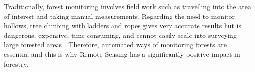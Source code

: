 \documentclass{subfiles}
\begin{document}
{\color{blue}Traditionally, forest monitoring involves field work such as travelling into the area of interest and taking manual measurements. Regarding the need to monitor hollows}, tree climbing with ladders and ropes gives very accurate results but is dangerous, expensive, time consuming, and cannot easily scale into surveying large forested areas \cite{Harper2004}\cite{Rayner2011}. Therefore, automated ways of monitoring forests are essential and this is why Remote Sensing has a significantly positive impact in forestry. 
 
\end{document}
